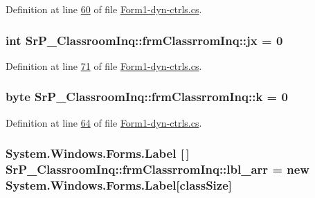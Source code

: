 \-Definition at line \hyperlink{_form1-dyn-ctrls_8cs_source_l00060}{60} of file \hyperlink{_form1-dyn-ctrls_8cs_source}{\-Form1-\/dyn-\/ctrls.\-cs}.

\hypertarget{class_sr_p___classroom_inq_1_1frm_classrrom_inq_a6206484c9b4d5d7558f8904cad77cded}{
\subsubsection[{jx}]{\setlength{\rightskip}{0pt plus 5cm}int {\bf \-Sr\-P\-\_\-\-Classroom\-Inq\-::frm\-Classrrom\-Inq\-::jx} = 0}}
\label{class_sr_p___classroom_inq_1_1frm_classrrom_inq_a6206484c9b4d5d7558f8904cad77cded}


\-Definition at line \hyperlink{_form1-dyn-ctrls_8cs_source_l00071}{71} of file \hyperlink{_form1-dyn-ctrls_8cs_source}{\-Form1-\/dyn-\/ctrls.\-cs}.

\hypertarget{class_sr_p___classroom_inq_1_1frm_classrrom_inq_ad13cb123edd99d95b379613aad0f2a39}{
\subsubsection[{k}]{\setlength{\rightskip}{0pt plus 5cm}byte {\bf \-Sr\-P\-\_\-\-Classroom\-Inq\-::frm\-Classrrom\-Inq\-::k} = 0}}
\label{class_sr_p___classroom_inq_1_1frm_classrrom_inq_ad13cb123edd99d95b379613aad0f2a39}


\-Definition at line \hyperlink{_form1-dyn-ctrls_8cs_source_l00064}{64} of file \hyperlink{_form1-dyn-ctrls_8cs_source}{\-Form1-\/dyn-\/ctrls.\-cs}.

\hypertarget{class_sr_p___classroom_inq_1_1frm_classrrom_inq_a7f0a5f5fff7a87e841b2793f89dcd997}{
\subsubsection[{lbl\-\_\-arr}]{\setlength{\rightskip}{0pt plus 5cm}\-System.\-Windows.\-Forms.\-Label \mbox{[}$\,$\mbox{]} {\bf \-Sr\-P\-\_\-\-Classroom\-Inq\-::frm\-Classrrom\-Inq\-::lbl\-\_\-arr} = new \-System.\-Windows.\-Forms.\-Label\mbox{[}{\bf class\-Size}\mbox{]}}}
\label{class_sr_p___classroom_inq_1_1frm_classrrom_inq_a7f0a5f5fff7a87e841b2793f89dcd997}


